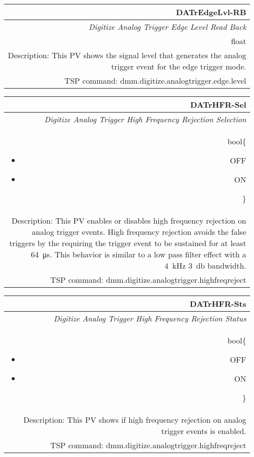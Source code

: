 \documentclass[openany]{article}
\begin{document}
		\begin{tabular}{N}
			\hline
			\bfseries DATrEdgeLvl-RB\label{pv:datredgelvl-rb} \\ \hline
			\emph{Digitize Analog Trigger Edge Level Read Back} \\
			float \\
			Description: This PV shows the signal level that generates the analog trigger event for the edge trigger mode. \\
			TSP command: dmm.digitize.analogtrigger.edge.level
		\end{tabular}

		\begin{tabular}{N}
			\hline
			\bfseries DATrHFR-Sel\label{pv:datrhfr-sel} \\ \hline
			\emph{Digitize Analog Trigger High Frequency Rejection Selection} \\
			bool\{\begin{itemize}[noitemsep]
				\small
				\item[] OFF
				\item[] ON
			\end{itemize}\} \\
			Description: This PV enables or disables high frequency rejection on analog trigger events. High frequency rejection avoids the false triggers by the requiring the trigger event to be sustained for at least \SI{64}{\micro\second}. This behavior is similar to a low pass filter effect with a \SI{4}{\kilo\hertz} \SI{3}{\decibel} bandwidth. \\
			TSP command: dmm.digitize.analogtrigger.highfreqreject
		\end{tabular}

		\begin{tabular}{N}
			\hline
			\bfseries DATrHFR-Sts\label{pv:datrhfr-sts} \\ \hline
			\emph{Digitize Analog Trigger High Frequency Rejection Status} \\
			bool\{\begin{itemize}[noitemsep]
				\small
				\item[] OFF
				\item[] ON
			\end{itemize}\} \\
			Description: This PV shows if high frequency rejection on analog trigger events is enabled. \\
			TSP command: dmm.digitize.analogtrigger.highfreqreject
		\end{tabular}
\end{document}
